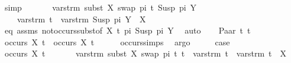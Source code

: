 \begin{isabellebody}
\ simp\isanewline
\ \ \isamarkupfalse%
\isanewline
\ \ \ \ {\isachardoublequoteopen}vars{\isacharunderscore}{\kern0pt}trm\ {\isacharparenleft}{\kern0pt}subst\ {\isacharbrackleft}{\kern0pt}{\isacharparenleft}{\kern0pt}X{\isacharcomma}{\kern0pt}\ swap\ pi\ t{}{\isacharparenright}{\kern0pt}{\isacharbrackright}{\kern0pt}\ {\isacharparenleft}{\kern0pt}Susp\ pi{\isacharprime}{\kern0pt}\ Y{\isacharparenright}{\kern0pt}{\isacharparenright}{\kern0pt}\ {\isacharequal}{\kern0pt}\ \isanewline
\ \ \ \ vars{\isacharunderscore}{\kern0pt}trm\ t{}\ {\isasymunion}\ vars{\isacharunderscore}{\kern0pt}trm\ {\isacharparenleft}{\kern0pt}Susp\ pi{\isacharprime}{\kern0pt}\ Y{\isacharparenright}{\kern0pt}\ {\isacharminus}{\kern0pt}\ {\isacharbraceleft}{\kern0pt}X{\isacharbraceright}{\kern0pt}{\isachardoublequoteclose}\isanewline
\ \ \ \ \isamarkupfalse%
\ eq\ assms{\isacharparenleft}{\kern0pt}{}{\isacharparenright}{\kern0pt}\ not{\isacharunderscore}{\kern0pt}occurs{\isacharunderscore}{\kern0pt}subst{\isacharbrackleft}{\kern0pt}of\ X\ t{}\ pi\ {\isacartoucheopen}Susp\ pi{\isacharprime}{\kern0pt}\ Y{\isacartoucheclose}{\isacharbrackright}{\kern0pt}\ \isamarkupfalse%
\ auto\isanewline
{}\isamarkupfalse%
\isanewline
\ \ \isamarkupfalse%
\ {\isacharparenleft}{\kern0pt}Paar\ t{}{}\ t{}{}{\isacharparenright}{\kern0pt}\isanewline
\ \ \isamarkupfalse%
\ {\isachardoublequoteopen}occurs\ X\ t{}{}\ {\isasymor}\ occurs\ X\ t{}{}{\isachardoublequoteclose}\isanewline
\ \ \ \ \isamarkupfalse%
\ occurs{\isachardot}{\kern0pt}simps{\isacharparenleft}{\kern0pt}{}{\isacharparenright}{\kern0pt}\ \isamarkupfalse%
\ argo\isanewline
\ \ \isamarkupfalse%
\ \isamarkupfalse%
\ {\isacharquery}{\kern0pt}case\isanewline
\ \ \isamarkupfalse%
\isanewline
\ \ \ \ \isamarkupfalse%
\ {\isachardoublequoteopen}occurs\ X\ t{}{}{\isachardoublequoteclose}\ \isanewline
\ \ \ \ \isamarkupfalse%
\ {\isachardoublequoteopen}vars{\isacharunderscore}{\kern0pt}trm\ {\isacharparenleft}{\kern0pt}subst\ {\isacharbrackleft}{\kern0pt}{\isacharparenleft}{\kern0pt}X{\isacharcomma}{\kern0pt}\ swap\ pi\ t{}{\isacharparenright}{\kern0pt}{\isacharbrackright}{\kern0pt}\ t{}{}{\isacharparenright}{\kern0pt}\ {\isacharequal}{\kern0pt}\ vars{\isacharunderscore}{\kern0pt}trm\ t{}\ {\isasymunion}\ vars{\isacharunderscore}{\kern0pt}trm\ t{}{}\ {\isacharminus}{\kern0pt}\ {\isacharbraceleft}{\kern0pt}X{\isacharbraceright}{\kern0pt}{\isachardoublequoteclose}\isanewline

\end{isabellebody}
